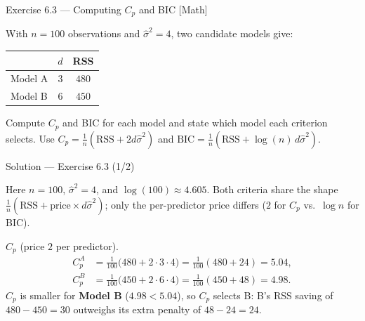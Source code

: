 \documentclass[aspectratio=169,11pt]{beamer}
\begin{document}
\begin{frame}{Exercise 6.3 --- Computing $C_p$ and BIC [Math]}
  \begin{exercise}
    With $n = 100$ observations and $\hat\sigma^2 = 4$, two candidate
    models give:
    \begin{center}
      \begin{tabular}{lcc}
        \toprule
        & $d$ & RSS \\
        \midrule
        Model A & $3$ & $480$ \\
        Model B & $6$ & $450$ \\
        \bottomrule
      \end{tabular}
    \end{center}
    Compute $C_p$ and BIC for each model and state which model each
    criterion selects. Use
    $C_p = \tfrac1n(\mathrm{RSS} + 2 d\hat\sigma^2)$ and
    $\mathrm{BIC} = \tfrac1n(\mathrm{RSS} + \log(n)\, d\hat\sigma^2)$.
  \end{exercise}
\end{frame}

\begin{frame}{Solution --- Exercise 6.3 (1/2)}
  \begin{solutionbox}
    Here $n = 100$, $\hat\sigma^2 = 4$, and $\log(100) \approx 4.605$.
    Both criteria share the shape $\tfrac1n(\mathrm{RSS} +
    \text{price} \times d\hat\sigma^2)$; only the per-predictor price
    differs ($2$ for $C_p$ vs.\ $\log n$ for BIC).

    \textbf{$C_p$} (price $2$ per predictor).
    \begin{align*}
      C_p^A &= \tfrac{1}{100}\bigl(480 + 2\cdot 3\cdot 4\bigr)
             = \tfrac{1}{100}(480 + 24) = 5.04 , \\
      C_p^B &= \tfrac{1}{100}\bigl(450 + 2\cdot 6\cdot 4\bigr)
             = \tfrac{1}{100}(450 + 48) = 4.98 .
    \end{align*}
    $C_p$ is smaller for \textbf{Model B} ($4.98 < 5.04$), so $C_p$
    selects B: B's RSS saving of $480 - 450 = 30$ outweighs its extra
    penalty of $48 - 24 = 24$.
  \end{solutionbox}
\end{frame}
\end{document}

